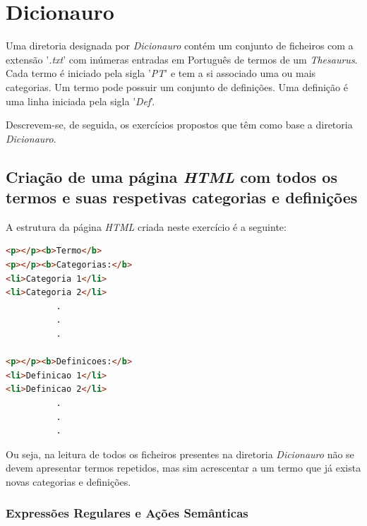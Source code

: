 \documentclass{article}
\begin{document}
\newpage
\section{Dicionauro}

Uma diretoria designada por \emph{Dicionauro} contém um conjunto de ficheiros com a extensão '\emph{.txt}' com inúmeras entradas em Português de termos de um \emph{Thesaurus}. Cada termo é iniciado pela sigla '\emph{PT}' e tem a si associado uma ou mais categorias. Um termo pode possuir um conjunto de definições. Uma definição é uma linha iniciada pela sigla '\emph{Def}'. 

Descrevem-se, de seguida, os exercícios propostos que têm como base a diretoria \emph{Dicionauro}.  


\subsection{Criação de uma página \emph{HTML} com todos os termos e suas respetivas categorias e definições}

A estrutura da página \emph{HTML} criada neste exercício é a seguinte:

\begin{lstlisting}[language=html]
<p></p><b>Termo</b>
<p></p><b>Categorias:</b>
<li>Categoria 1</li>
<li>Categoria 2</li>
          .
          .
          .
        
<p></p><b>Definicoes:</b>
<li>Definicao 1</li>
<li>Definicao 2</li>
          .
          .
          .
\end{lstlisting}


Ou seja, na leitura de todos os ficheiros presentes na diretoria \emph{Dicionauro} não se devem apresentar termos repetidos, mas sim acrescentar a um termo que já exista novas categorias e definições.


\subsubsection{Expressões Regulares e Ações Semânticas}
\end{document}
